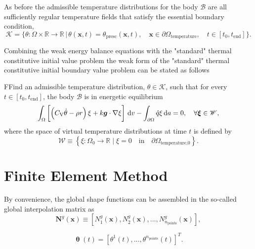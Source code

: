 As before the admissible temperature distributions for the body \(\mathcal B\) are all sufficiently regular temperature fields that satisfy the essential boundary condition,
\begin{equation}
  \mathscr K = \{\theta:\Omega \times \mathbb R \to \mathbb R\,|\,\theta(\bm x, t) = \theta_\text{presc}(\bm x, t),\quad \bm x\in \partial \Omega_\text{temperature},\quad t\in[t_0, t_\text{end}]\}.
\end{equation}

Combining the weak energy balance equations with the "standard" thermal constitutive initial value problem the weak form of the "standard" thermal constitutive initial boundary value problem can be stated as follows
 \begin{problem}
     FFind an admissible temperature distribution, $\theta \in \mathscr{K}$, such that for every $t\in [t_0,t_\text{end}]$, the body $\mathscr{B}$ is in energetic equilibrium
         \begin{equation}
         \int_\Omega   \left[\left(C_\mathrm{V} \dot \theta - \rho r\right) \xi +k\bm g\cdot \nabla \xi\right]\,\mathrm{d} v - \int_{\partial\Omega} \hat q \xi\,\mathrm{d} a = 0,\quad \forall \bm{\xi} \in \mathscr{W},
     \end{equation}
     where the space of virtual temperature distributions at time $t$ is defined by
     \begin{equation}
         \mathscr{W} \equiv \left\{\xi:\Omega_0\to \mathbb R\;|\;\xi = 0\quad \text{in}\quad \partial\Omega_\text{temperature,0}\right\}.
     \end{equation}
 \end{problem}

\section{Finite Element Method}

By convenience, the global shape functions can be assembled in the so-called global interpolation matrix as
\begin{equation}
\mathbf{N}^{g}(\boldsymbol{x}) \equiv\left[N_1^g(\bm x), N_2^g(\bm x), \dots, N^g_{n_\text{points}}(\bm x)\right],
\end{equation}

\begin{equation}
 \bm \uptheta (t)= \left[\theta^{1}(t), \dots, \theta^{n_{\text {points}}}(t)\right]^{T}.
\end{equation}

